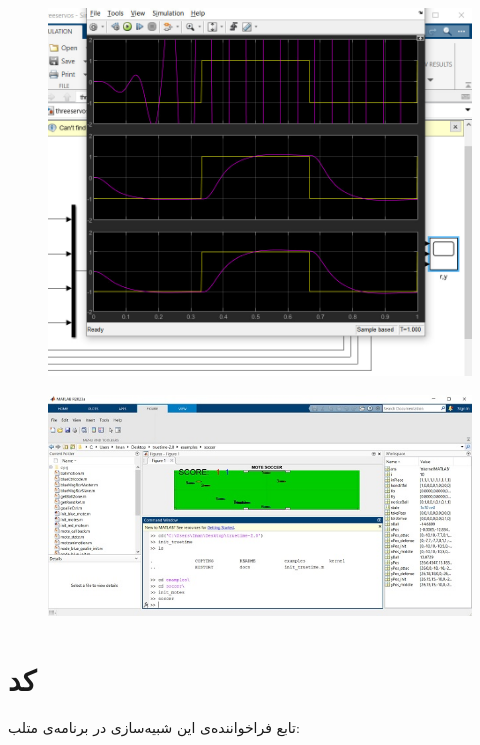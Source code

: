 \begin{figure}[H]
	\centering
	\includegraphics{10.jpg}
	\label{fig:label4}
\end{figure}

\begin{figure}[H]
	\centering
	\includegraphics{11.jpg}
	\label{fig:label4}
\end{figure}

\newpage

\section*{کد }

تابع فراخواننده‌ی این شبیه‌سازی در برنامه‌ی متلب:

